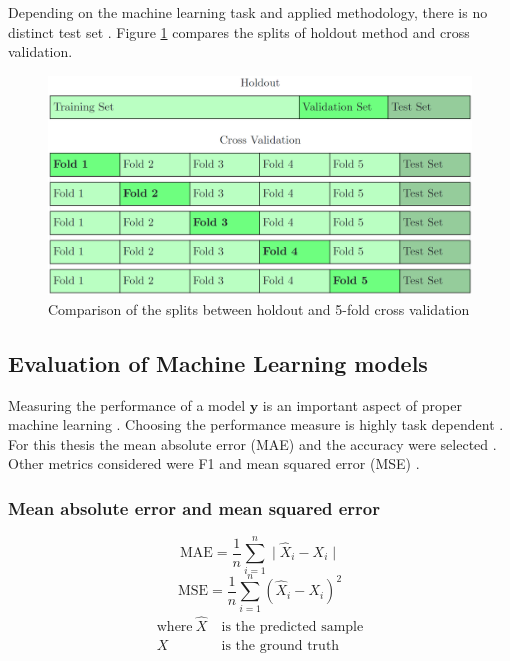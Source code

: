 \documentclass[draft,final,oneside]{vutinfth} %
\begin{document}
Depending on the machine learning task and applied methodology, there is no distinct test set \cite{holdoutcrossvalidation}. Figure \ref{fig:holdoutvscv} compares the splits of holdout method and cross validation.

\begin{figure}[ht]
	\centering
  	\includegraphics[width=1.0\textwidth]{graphics/holdoutvscv.png}
	\caption{Comparison of the splits between holdout and 5-fold cross validation}
	\label{fig:holdoutvscv}
\end{figure}

\subsection{Evaluation of Machine Learning models}

Measuring the performance of a model $\boldsymbol{y}$ is an important aspect of proper machine learning \cite{performanceevaluation}. Choosing the performance measure is highly task dependent \cite{performanceevaluation}. For this thesis the mean absolute error (MAE) and the accuracy were selected \cite{accuracy}. Other metrics considered were F1 and mean squared error (MSE) \cite{accuracy} \cite{Powers2008EvaluationFP}.

\subsubsection{Mean absolute error and mean squared error}
\begin{equation}
\text{MAE} = \frac{1}{n}\textstyle \sum_{i=1}^n \displaystyle\mid \hat{X}_i - X_i \mid
\end{equation}
\begin{equation}
\text{MSE} = \frac{1}{n}\textstyle \sum_{i=1}^n \displaystyle\left( \hat{X}_i - X_i \right)^2
\end{equation}
\begin{align*}
\text{where}~\hat{X}&~\text{is the predicted sample} \\
X&~\text{is the ground truth}
\end{align*}
\end{document}
